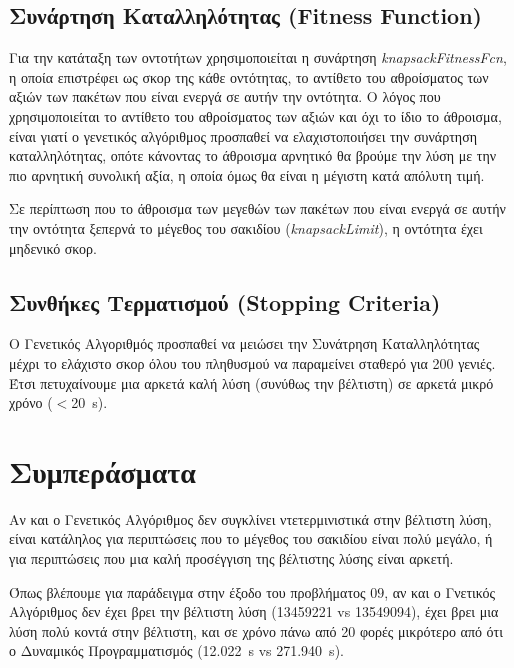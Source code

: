 \documentclass{article}
\begin{document}
\subsection{Συνάρτηση Καταλληλότητας (Fitness Function)}

Για την κατάταξη των οντοτήτων χρησιμοποιείται η συνάρτηση
\textit{knapsackFitnessFcn}, η οποία επιστρέφει ως σκορ της κάθε οντότητας, το
αντίθετο του αθροίσματος των αξιών των πακέτων που είναι ενεργά σε αυτήν την
οντότητα. Ο λόγος που χρησιμοποιείται το αντίθετο του αθροίσματος των αξιών και
όχι το ίδιο το άθροισμα, είναι γιατί ο γενετικός αλγόριθμος προσπαθεί να
ελαχιστοποιήσει την συνάρτηση καταλληλότητας, οπότε κάνοντας το άθροισμα
αρνητικό θα βρούμε την λύση με την πιο αρνητική συνολική αξία, η οποία όμως θα
είναι η μέγιστη κατά απόλυτη τιμή.

Σε περίπτωση που το άθροισμα των μεγεθών των πακέτων που είναι ενεργά σε αυτήν
την οντότητα ξεπερνά το μέγεθος του σακιδίου (\textit{knapsackLimit}), η
οντότητα έχει μηδενικό σκορ.

\subsection{Συνθήκες Τερματισμού (Stopping Criteria)}

Ο Γενετικός Αλγοριθμός προσπαθεί να μειώσει την Συνάτρηση Καταλληλότητας μέχρι
το ελάχιστο σκορ όλου του πληθυσμού να παραμείνει σταθερό για 200 γενιές. Έτσι
πετυχαίνουμε μια αρκετά καλή λύση (συνύθως την βέλτιστη) σε αρκετά μικρό χρόνο
($<$\SI{20}{\second}).

\section{Συμπεράσματα}

Αν και ο Γενετικός Αλγόριθμος δεν συγκλίνει ντετερμινιστικά στην βέλτιστη λύση,
είναι κατάληλος για περιπτώσεις που το μέγεθος του σακιδίου είναι πολύ μεγάλο, ή
για περιπτώσεις που μια καλή προσέγγιση της βέλτιστης λύσης είναι αρκετή.

Όπως βλέπουμε για παράδειγμα στην έξοδο του προβλήματος $09$, αν και ο Γνετικός
Αλγόριθμος δεν έχει βρει την βέλτιστη λύση (\num{13459221} vs \num{13549094}),
έχει βρει μια λύση πολύ κοντά στην βέλτιστη, και σε χρόνο πάνω από 20 φορές
μικρότερο από ότι ο Δυναμικός Προγραμματισμός (\SI{12.022}{\second} vs
\SI{271.940}{\second}).
\end{document}
